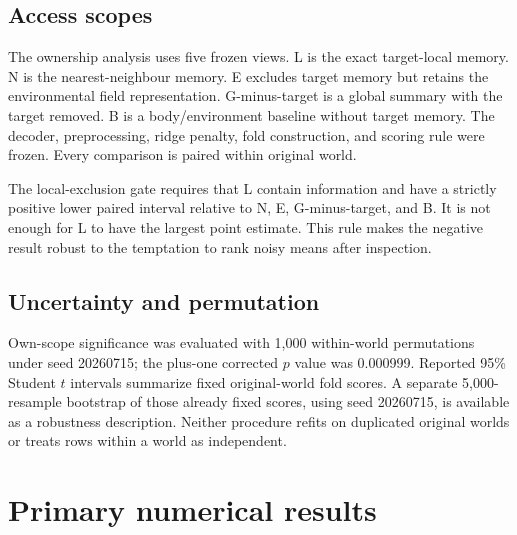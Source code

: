 \documentclass[10pt]{article}
\begin{document}
\subsection{Access scopes}

The ownership analysis uses five frozen views. L is the exact target-local memory. N is the nearest-neighbour memory. E excludes target memory but retains the environmental field representation. G-minus-target is a global summary with the target removed. B is a body/environment baseline without target memory. The decoder, preprocessing, ridge penalty, fold construction, and scoring rule were frozen. Every comparison is paired within original world.

The local-exclusion gate requires that L contain information and have a strictly positive lower paired interval relative to N, E, G-minus-target, and B. It is not enough for L to have the largest point estimate. This rule makes the negative result robust to the temptation to rank noisy means after inspection.

\subsection{Uncertainty and permutation}

Own-scope significance was evaluated with 1,000 within-world permutations under seed 20260715; the plus-one corrected $p$ value was 0.000999. Reported 95\% Student $t$ intervals summarize fixed original-world fold scores. A separate 5,000-resample bootstrap of those already fixed scores, using seed 20260715, is available as a robustness description. Neither procedure refits on duplicated original worlds or treats rows within a world as independent.

\section{Primary numerical results}
\end{document}
